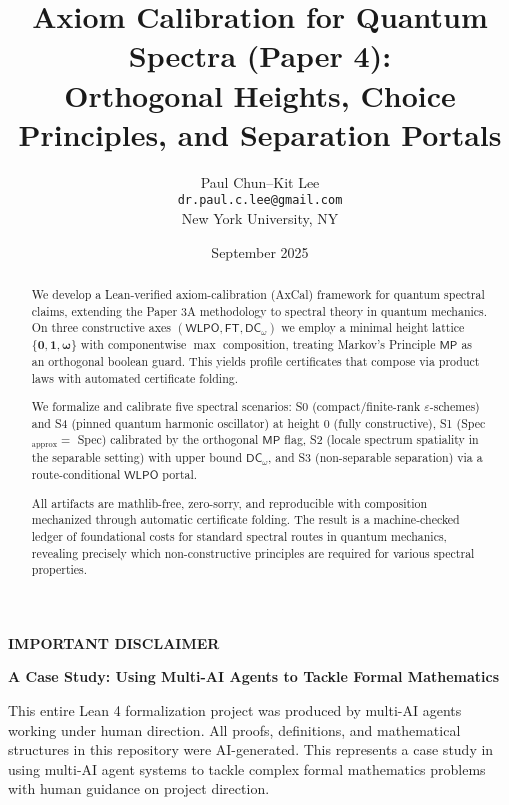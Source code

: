 \documentclass[11pt]{article}
\title{Axiom Calibration for Quantum Spectra (Paper 4):\\
Orthogonal Heights, Choice Principles, and Separation Portals}
\author{Paul Chun--Kit Lee\\
\texttt{dr.paul.c.lee@gmail.com}\\
New York University, NY}
\date{September 2025}
\newcommand{\WLPO}{\mathsf{WLPO}}
\newcommand{\FT}{\mathsf{FT}}
\newcommand{\DCw}{\mathsf{DC}_{\omega}}
\newcommand{\MP}{\mathsf{MP}}
\newcommand{\hzero}{\mathbf{0}}
\newcommand{\hone}{\mathbf{1}}
\newcommand{\homega}{\boldsymbol{\omega}}
\theoremstyle{plain}
\theoremstyle{definition}
\theoremstyle{remark}
\begin{document}
\maketitle

\begin{abstract}
We develop a Lean-verified axiom-calibration (AxCal) framework for quantum spectral claims, extending the Paper 3A methodology to spectral theory in quantum mechanics.
On three constructive axes \((\WLPO,\FT,\DCw)\) we employ a minimal height lattice
\(\{\hzero,\hone,\homega\}\) with componentwise \(\max\) composition, treating Markov's Principle \(\MP\) as an
orthogonal boolean guard. This yields profile certificates that compose via product
laws with automated certificate folding. 

We formalize and calibrate five spectral scenarios:
S0 (compact/finite-rank \(\varepsilon\)-schemes) and S4 (pinned quantum harmonic oscillator) at height \(0\) (fully constructive),
S1 (Spec\(_{\mathrm{approx}}=\) Spec) calibrated by the orthogonal \(\MP\) flag, 
S2 (locale spectrum spatiality in the separable setting) with upper bound \(\DCw\), 
and S3 (non-separable separation) via a route-conditional \(\WLPO\) portal. 

All artifacts are mathlib-free, zero-sorry, and reproducible with composition mechanized through automatic certificate folding. The result
is a machine-checked ledger of foundational costs for standard spectral routes in quantum mechanics,
revealing precisely which non-constructive principles are required for various spectral properties.
\end{abstract}

\begin{mdframed}[backgroundcolor=gray!10, linewidth=0pt]
\textbf{IMPORTANT DISCLAIMER}

\textbf{A Case Study: Using Multi-AI Agents to Tackle Formal Mathematics}

This entire Lean 4 formalization project was produced by multi-AI agents working under human direction. All proofs, definitions, and mathematical structures in this repository were AI-generated. This represents a case study in using multi-AI agent systems to tackle complex formal mathematics problems with human guidance on project direction.
\end{mdframed}

\tableofcontents
\end{document}
